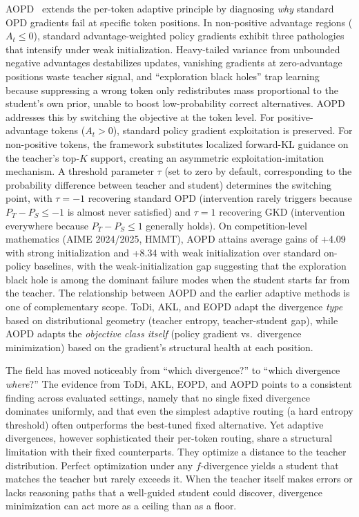 \documentclass{article} %
\begin{document}
AOPD~\citep{2605.06387} extends the per-token adaptive principle by diagnosing \emph{why} standard OPD gradients fail at specific token positions. In non-positive advantage regions ($A_t \le 0$), standard advantage-weighted policy gradients exhibit three pathologies that intensify under weak initialization. Heavy-tailed variance from unbounded negative advantages destabilizes updates, vanishing gradients at zero-advantage positions waste teacher signal, and ``exploration black holes'' trap learning because suppressing a wrong token only redistributes mass proportional to the student's own prior, unable to boost low-probability correct alternatives. AOPD addresses this by switching the objective at the token level. For positive-advantage tokens ($A_t > 0$), standard policy gradient exploitation is preserved. For non-positive tokens, the framework substitutes localized forward-KL guidance on the teacher's top-$K$ support, creating an asymmetric exploitation-imitation mechanism. A threshold parameter $\tau$ (set to zero by default, corresponding to the probability difference between teacher and student) determines the switching point, with $\tau = -1$ recovering standard OPD (intervention rarely triggers because $P_T - P_S \le -1$ is almost never satisfied) and $\tau = 1$ recovering GKD (intervention everywhere because $P_T - P_S \le 1$ generally holds). On competition-level mathematics (AIME 2024/2025, HMMT), AOPD attains average gains of +4.09 with strong initialization and +8.34 with weak initialization over standard on-policy baselines, with the weak-initialization gap suggesting that the exploration black hole is among the dominant failure modes when the student starts far from the teacher. The relationship between AOPD and the earlier adaptive methods is one of complementary scope. ToDi, AKL, and EOPD adapt the divergence \emph{type} based on distributional geometry (teacher entropy, teacher-student gap), while AOPD adapts the \emph{objective class itself} (policy gradient vs.\ divergence minimization) based on the gradient's structural health at each position.

The field has moved noticeably from ``which divergence?'' to ``which divergence \emph{where}?'' The evidence from ToDi, AKL, EOPD, and AOPD points to a consistent finding across evaluated settings, namely that no single fixed divergence dominates uniformly, and that even the simplest adaptive routing (a hard entropy threshold) often outperforms the best-tuned fixed alternative. Yet adaptive divergences, however sophisticated their per-token routing, share a structural limitation with their fixed counterparts. They optimize a distance to the teacher distribution. Perfect optimization under any $f$-divergence yields a student that matches the teacher but rarely exceeds it. When the teacher itself makes errors or lacks reasoning paths that a well-guided student could discover, divergence minimization can act more as a ceiling than as a floor.
\end{document}

